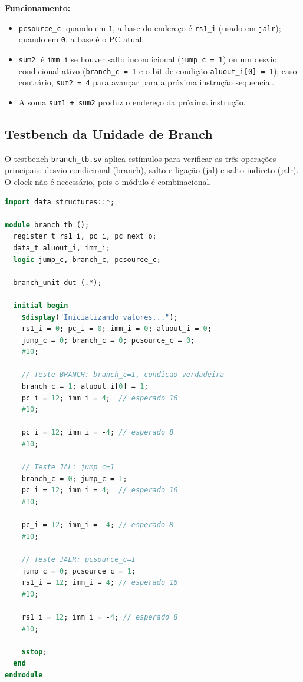 \documentclass[
	12pt,				%
	oneside,
	a4paper,			%
	english,			%
	french,				%
	spanish,			%
	brazil,				%
	]{abntex2}
\begin{document}
\textbf{Funcionamento:}
\begin{itemize}
  \item \texttt{pcsource\_c}: quando em \texttt{1}, a base do endereço é \texttt{rs1\_i} (usado em \texttt{jalr}); quando em \texttt{0}, a base é o PC atual.
  \item \texttt{sum2}: é \texttt{imm\_i} se houver salto incondicional (\texttt{jump\_c = 1}) ou um desvio condicional ativo (\texttt{branch\_c = 1} e o bit de condição \texttt{aluout\_i[0] = 1}); caso contrário, \texttt{sum2 = 4} para avançar para a próxima instrução sequencial.
  \item A soma \texttt{sum1 + sum2} produz o endereço da próxima instrução.
\end{itemize}

\subsection{Testbench da Unidade de Branch}

O testbench \texttt{branch\_tb.sv} aplica estímulos para verificar as três operações principais: desvio condicional (branch), salto e ligação (jal) e salto indireto (jalr). O clock não é necessário, pois o módulo é combinacional.

\begin{lstlisting}[language=SystemVerilog, caption={Testbench branch\_tb.sv}, label={lst:branch_tb}]
import data_structures::*;

module branch_tb ();
  register_t rs1_i, pc_i, pc_next_o;
  data_t aluout_i, imm_i;
  logic jump_c, branch_c, pcsource_c;

  branch_unit dut (.*);

  initial begin
    $display("Inicializando valores...");
    rs1_i = 0; pc_i = 0; imm_i = 0; aluout_i = 0;
    jump_c = 0; branch_c = 0; pcsource_c = 0;
    #10;

    // Teste BRANCH: branch_c=1, condicao verdadeira
    branch_c = 1; aluout_i[0] = 1;
    pc_i = 12; imm_i = 4;  // esperado 16
    #10;

    pc_i = 12; imm_i = -4; // esperado 8
    #10;

    // Teste JAL: jump_c=1
    branch_c = 0; jump_c = 1;
    pc_i = 12; imm_i = 4;  // esperado 16
    #10;

    pc_i = 12; imm_i = -4; // esperado 8
    #10;

    // Teste JALR: pcsource_c=1
    jump_c = 0; pcsource_c = 1;
    rs1_i = 12; imm_i = 4; // esperado 16
    #10;

    rs1_i = 12; imm_i = -4; // esperado 8
    #10;

    $stop;
  end
endmodule
\end{lstlisting}
\end{document}
